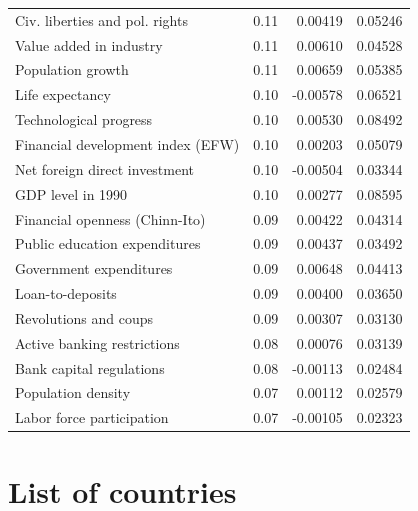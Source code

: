 \begin{refsection}
\begin{subappendices}
\begin{table}[!ht]
\begin{tabular}{lrrr}
      Civ. liberties and pol. rights & 0.11 & 0.00419 & 0.05246 \\ 
      Value added in industry & 0.11 & 0.00610 & 0.04528 \\ 
      Population growth & 0.11 & 0.00659 & 0.05385 \\ 
      Life expectancy & 0.10 & -0.00578 & 0.06521 \\ 
      Technological progress & 0.10 & 0.00530 & 0.08492 \\ 
      Financial development index (EFW) & 0.10 & 0.00203 & 0.05079 \\ 
      Net foreign direct investment & 0.10 & -0.00504 & 0.03344 \\ 
      GDP level in 1990 & 0.10 & 0.00277 & 0.08595 \\ 
      Financial openness (Chinn-Ito) & 0.09 & 0.00422 & 0.04314 \\ 
      Public education expenditures & 0.09 & 0.00437 & 0.03492 \\ 
      Government expenditures & 0.09 & 0.00648 & 0.04413 \\ 
      Loan-to-deposits & 0.09 & 0.00400 & 0.03650 \\ 
      Revolutions and coups & 0.09 & 0.00307 & 0.03130 \\ 
      Active banking restrictions & 0.08 & 0.00076 & 0.03139 \\ 
      Bank capital regulations & 0.08 & -0.00113 & 0.02484 \\ 
      Population density & 0.07 & 0.00112 & 0.02579 \\ 
      Labor force participation & 0.07 & -0.00105 & 0.02323 \\ 
      \bottomrule
    \end{tabular}
    \end{table}
    
    \clearpage
    \section{List of countries}
    

\end{subappendices}
\end{refsection}
